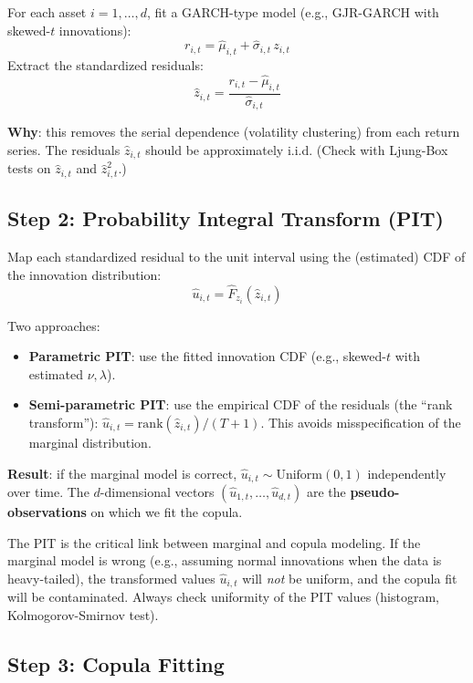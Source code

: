 \documentclass[11pt, a4paper]{article}
\theoremstyle{definition}
\theoremstyle{plain}
\theoremstyle{remark}
\begin{document}
For each asset $i = 1, \ldots, d$, fit a GARCH-type model (e.g., GJR-GARCH with skewed-$t$ innovations):
\[
    r_{i,t} = \hat\mu_{i,t} + \hat\sigma_{i,t} \, z_{i,t}
\]
Extract the standardized residuals:
\[
    \hat{z}_{i,t} = \frac{r_{i,t} - \hat\mu_{i,t}}{\hat\sigma_{i,t}}
\]

\textbf{Why}: this removes the serial dependence (volatility clustering) from each return series.
The residuals $\hat{z}_{i,t}$ should be approximately i.i.d.
(Check with Ljung-Box tests on $\hat{z}_{i,t}$ and $\hat{z}_{i,t}^2$.)

\subsection{Step 2: Probability Integral Transform (PIT)}

Map each standardized residual to the unit interval using the (estimated) CDF of the innovation distribution:
\[
    \hat{u}_{i,t} = \hat{F}_{z_i}(\hat{z}_{i,t})
\]

Two approaches:
\begin{itemize}
    \item \textbf{Parametric PIT}: use the fitted innovation CDF (e.g., skewed-$t$ with estimated $\nu, \lambda$).
    \item \textbf{Semi-parametric PIT}: use the empirical CDF of the residuals (the ``rank transform''):
          $\hat{u}_{i,t} = \text{rank}(\hat{z}_{i,t}) / (T+1)$.
          This avoids misspecification of the marginal distribution.
\end{itemize}

\textbf{Result}: if the marginal model is correct, $\hat{u}_{i,t} \sim \text{Uniform}(0,1)$ independently over time.
The $d$-dimensional vectors $(\hat{u}_{1,t}, \ldots, \hat{u}_{d,t})$ are the \textbf{pseudo-observations}
on which we fit the copula.

\begin{warningbox}
The PIT is the critical link between marginal and copula modeling.
If the marginal model is wrong (e.g., assuming normal innovations when the data is heavy-tailed),
the transformed values $\hat{u}_{i,t}$ will \emph{not} be uniform,
and the copula fit will be contaminated.
Always check uniformity of the PIT values (histogram, Kolmogorov-Smirnov test).
\end{warningbox}

\subsection{Step 3: Copula Fitting}
\end{document}

